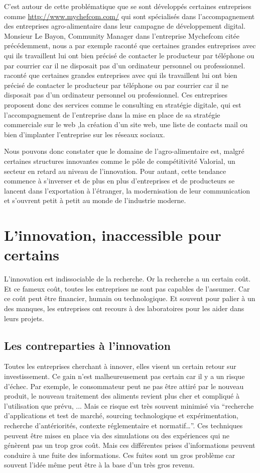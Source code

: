 \documentclass[a4paper,12pt]{report}
\begin{document}
			C’est autour de cette problématique que se sont développés certaines entreprises comme \url{http://www.mychefcom.com/} qui sont spécialisés dans l’accompagnement des entreprises agro-alimentaire dans leur campagne de développement digital. Monsieur Le Bayon, Community Manager dans l’entreprise Mychefcom citée précédemment, nous a par exemple raconté que certaines grandes entreprises avec qui ils travaillent lui ont bien précisé de contacter le producteur par téléphone ou par courrier car il ne disposait pas d’un ordinateur personnel ou professionnel. raconté que certaines grandes entreprises avec qui ils travaillent lui ont bien précisé de contacter le producteur par téléphone ou par courrier car il ne disposait pas d’un ordinateur personnel ou professionnel. Ces entreprises proposent donc des services comme le consulting en stratégie digitale, qui est l’accompagnement de l’entreprise dans la mise en place de sa stratégie commerciale sur le web ,la création d’un site web, une liste de contacts mail ou bien d’implanter l’entreprise sur les réseaux sociaux.
			
			Nous pouvons donc constater que le domaine de l’agro-alimentaire est, malgré certaines structures innovantes comme le pôle de compétitivité Valorial, un secteur en retard au niveau de l’innovation. Pour autant, cette tendance commence à s’inverser et de plus en plus d’entreprises et de producteurs se lancent dans l’exportation à l’étranger, la modernisation de leur communication et s’ouvrent petit à petit au monde de l’industrie moderne.
			
	\section{L'innovation, inaccessible pour certains}
		L’innovation est indissociable de la recherche. Or la recherche a un certain coût. Et ce fameux coût, toutes les entreprises ne sont pas capables de l’assumer. Car ce coût peut être financier, humain ou technologique. Et souvent pour palier à un des manques, les entreprises ont recours à des laboratoires pour les aider dans leurs projets.
		
		\subsection{Les contreparties à l'innovation}
		
		Toutes les entreprises cherchant à innover, elles visent un certain retour sur investissement. Ce gain n’est malheureusement pas certain car il y a un risque d'échec. Par exemple, le consommateur peut ne pas être attiré par le nouveau produit, le nouveau traitement des aliments revient plus cher et compliqué à l’utilisation que prévu, ... Mais ce risque est très souvent minimisé via “recherche d’applications et test de marché, sourcing technologique et expérimentation, recherche d’antériorités, contexte réglementaire et  normatif…”\cite{GlobalVision}. Ces techniques peuvent être mises en place via des simulations ou des expériences qui ne génèrent pas un trop gros coût.
		Mais ces différentes prises d’informations peuvent conduire à une fuite des informations. Ces fuites sont un gros problème car souvent l’idée même peut être à la base d’un très gros revenu.
		
\end{document}
